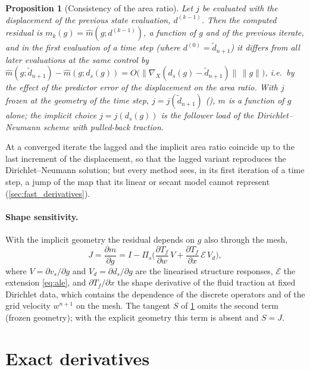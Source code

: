 \documentclass[11pt,a4paper]{article}
\newtheorem{proposition}{Proposition}[section]
\theoremstyle{definition}
\theoremstyle{remark}
\newcommand{\Pis}{\Pi_{s}}
\begin{document}
\begin{proposition}[Consistency of the area ratio]\label{prop:area_ratio}
Let $j$ be evaluated with the displacement of the \emph{previous} state evaluation, $d^{(k-1)}$.
Then the computed residual is $m_k(g)=\hat m(g;d^{(k-1)})$, a function of $g$ and of the previous
iterate, and in the first evaluation of a time step (where $d^{(0)}=\tilde d_{n+1}$) it differs from
all later evaluations at the same control by
$\hat m(g;\tilde d_{n+1})-\hat m(g;d_s(g))=O\big(\|\nabla_X(d_s(g)-\tilde d_{n+1})\|\,\|g\|\big)$,
i.e.\ by the effect of the predictor error of the displacement on the area ratio. With $j$ frozen
at the geometry of the time step, $j=j(\tilde d_{n+1})$ (),
$m$ is a function of $g$ alone; the implicit choice $j=j(d_s(g))$ is the follower load of the
Dirichlet--Neumann scheme with pulled-back traction.
\end{proposition}

At a converged iterate the lagged and the implicit area ratio coincide up to the last increment of
the displacement, so that the lagged variant reproduces the Dirichlet--Neumann solution; but every
method sees, in its first iteration of a time step, a jump of the map that its linear or secant
model cannot represent (\cref{sec:fast_derivatives}).

\paragraph{Shape sensitivity.} With the implicit geometry the residual depends on $g$ also through
the mesh,
\begin{equation}\label{eq:shape}
  J=\frac{\partial m}{\partial g}=I-\Pis\Big(\frac{\partial T_f}{\partial w}\,V
  +\frac{\partial T_f}{\partial x}\,\mathcal E\,V_d\Big),
\end{equation}
where $V=\partial v_s/\partial g$ and $V_d=\partial d_s/\partial g$ are the linearised structure
responses, $\mathcal E$ the extension \eqref{eq:ale}, and $\partial T_f/\partial x$ the shape
derivative of the fluid traction at fixed Dirichlet data, which contains the dependence of the
discrete operators and of the grid velocity $w^{n+1}$ on the mesh. The tangent $S$ of
\cref{sec:derivatives} omits the second term (frozen geometry); with the explicit geometry this
term is absent and $S=J$.

\section{Exact derivatives}\label{sec:derivatives}
\end{document}
